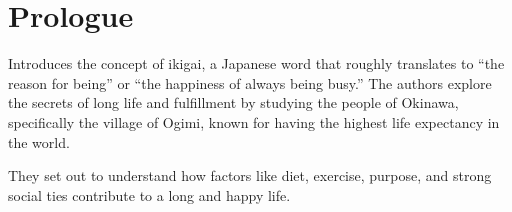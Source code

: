\section*{Prologue}
Introduces the concept of ikigai, a Japanese word that roughly translates to “the reason for being” or “the happiness of always being busy.” The authors explore the secrets of long life and fulfillment by studying the people of Okinawa, specifically the village of Ogimi, known for having the highest life expectancy in the world.

They set out to understand how factors like diet, exercise, purpose, and strong social ties contribute to a long and happy life.
